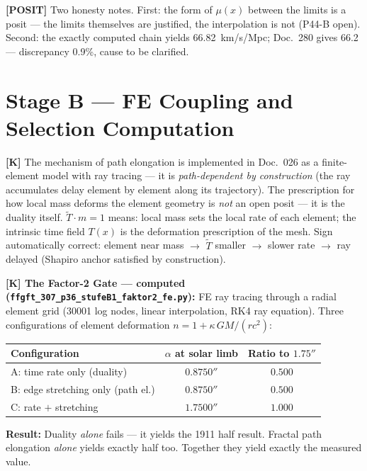 \documentclass[11pt]{report}
\begin{document}
\medskip
\textbf{[POSIT]} Two honesty notes.
First: the form of $\mu(x)$ between the limits is a posit —
the limits themselves are justified, the interpolation is not
(P44-B open).
Second: the exactly computed chain yields 66.82~km/s/Mpc;
Doc.~280 gives 66.2 — discrepancy 0.9\%, cause to be clarified.

\section{Stage B — FE Coupling and Selection Computation}

\textbf{[K]} The mechanism of path elongation is implemented in
Doc.~026 as a finite-element model with ray tracing — it is
\emph{path-dependent by construction} (the ray accumulates delay
element by element along its trajectory).
The prescription for how local mass deforms the element geometry is
\emph{not} an open posit — it is the duality itself. $\tilde T \cdot m = 1$
means: local mass sets the local rate of each element; the intrinsic
time field $T(x)$ is the deformation prescription of the mesh. Sign
automatically correct: element near mass $\to$ $\tilde T$ smaller
$\to$ slower rate $\to$ ray delayed (Shapiro anchor satisfied by
construction).

\medskip
\textbf{[K] The Factor-2 Gate — computed
(\texttt{ffgft\_307\_p36\_stufeB1\_faktor2\_fe.py}):}
FE ray tracing through a radial element grid (30001 log nodes,
linear interpolation, RK4 ray equation). Three configurations of
element deformation $n = 1 + \kappa\,GM/(rc^2)$:

\begin{center}
\begin{tabular}{lcc}
\toprule
Configuration & $\alpha$ at solar limb & Ratio to $1.75''$\\
\midrule
A: time rate only (duality)         & $0.8750''$ & $0.500$\\
B: edge stretching only (path el.)  & $0.8750''$ & $0.500$\\
C: rate $+$ stretching              & $1.7500''$ & $1.000$\\
\bottomrule
\end{tabular}
\end{center}

\textbf{Result:} Duality \emph{alone} fails — it yields the 1911 half
result. Fractal path elongation \emph{alone} yields exactly half too.
Together they yield exactly the measured value.
\end{document}
